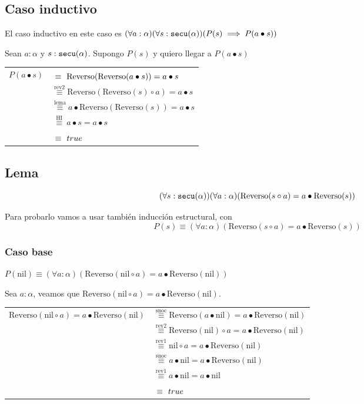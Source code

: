 \documentclass[hidelinks,a4paper,10pt, nofootinbib]{article}
\newcommand{\secu}{\ensuremath\texttt{secu}(\alpha)}
\newcommand{\rev}{\text{Reverso}}
\newcommand{\cons}{\bullet}
\newcommand{\snoc}{\circ}
\newcommand{\nil}{\text{nil}}
\newcommand{\por}[1]{\overset{\text{#1}}{\equiv}}
\newcommand{\ph}{\phantom{rev1}}
\begin{document}
\subsection*{Caso inductivo}
El caso inductivo en este caso es $(\forall a : \alpha) (\forall s : \secu) (P(s) \implies P(a \cons s))$

Sean $a : \alpha$ y $s : \secu$. Supongo $P(s)$ y quiero llegar a $P(a \cons s)$

\begin{center}
\begin{tabular}{c l}
$P(a \cons s)$ & $\por{\ph} \rev(\rev(a \cons s)) = a \cons s$ \\
               & $\por{rev2} \rev(\rev(s) \circ a) = a \cons s$ \\
               & $\por{lema} a \cons \rev(\rev(s)) = a \cons s$ \\
               & $\por{ HI } a \cons s = a \cons s$ \\ 
               & $\por{\ph} true$ \\
\end{tabular}
\end{center}

\subsection*{Lema}

\[(\forall s : \secu) (\forall a : \alpha) (\rev(s \circ a) = a \cons \rev(s))\]

Para probarlo vamos a usar también inducción estructural, con 
\[P(s) \equiv (\forall a : \alpha) (\rev(s \circ a) = a \cons \rev(s))\]

\subsubsection*{Caso base}
$P(\nil) \equiv (\forall a : \alpha) (\rev(\nil \circ a) = a \cons \rev(\nil))$

Sea $ a : \alpha$, veamos que $  \rev(\nil \circ a) = a \cons \rev(\nil)$.

\begin{center}
\begin{tabular}{r l}
$\rev(\nil \circ a) = a \cons \rev(\nil)$ & $\por{snoc} \rev(a \cons \nil) = a \cons \rev(\nil)$ \\
               & $\por{rev2} \rev(\nil) \snoc a = a \cons \rev(\nil)$ \\
               & $\por{rev1} \nil \snoc a = a \cons \rev(\nil)$ \\
               & $\por{snoc} a \cons \nil = a \cons \rev(\nil)$ \\ 
               & $\por{rev1} a \cons \nil = a \cons \nil$ \\ 
               & $\por{\ph} true$ \\
\end{tabular}
\end{center}
\end{document}
